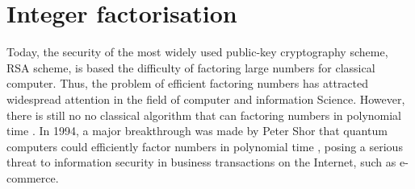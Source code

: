 \documentclass[aps,pra,singlecolumn,superscriptaddress]{revtex4-1}
\begin{document}











\section{Integer factorisation}

Today, the security of the most widely used public-key cryptography scheme, RSA scheme, is based the difficulty of factoring large numbers for classical computer. Thus, the problem of efficient factoring numbers has attracted widespread attention in the field of computer and information Science. However, there is still no no classical algorithm that can factoring numbers in polynomial time \cite{pollard1974theorems}. In 1994, a major breakthrough was made by Peter Shor that quantum computers could efficiently factor numbers in polynomial time \cite{shor1997polynomial,shor1994algorithms}, posing a serious threat to information security in business transactions on the Internet, such as e-commerce.
\end{document}
